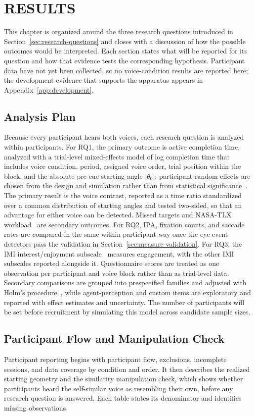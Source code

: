 \chapter{RESULTS}
\label{ch:evaluation}
This chapter is organized around the three research questions introduced in Section~\ref{sec:research-questions} and closes with a discussion of how the possible outcomes would be interpreted. Each section states what will be reported for its question and how that evidence tests the corresponding hypothesis. Participant data have not yet been collected, so no voice-condition results are reported here; the development evidence that supports the apparatus appears in Appendix~\ref{app:development}.

\section{Analysis Plan}
\label{sec:analysis-plan}
Because every participant hears both voices, each research question is analyzed within participants. For RQ1, the primary outcome is active completion time, analyzed with a trial-level mixed-effects model of log completion time that includes voice condition, period, assigned voice order, trial position within the block, and the absolute pre-cue starting angle $|\theta_0|$; participant random effects are chosen from the design and simulation rather than from statistical significance~\cite{barr2013random}. The primary result is the voice contrast, reported as a time ratio standardized over a common distribution of starting angles and tested two-sided, so that an advantage for either voice can be detected. Missed targets and NASA-TLX workload~\cite{hart1988nasatlx} are secondary outcomes. For RQ2, IPA, fixation counts, and saccade rates are compared in the same within-participant way once the eye-event detectors pass the validation in Section~\ref{sec:measure-validation}. For RQ3, the IMI interest/enjoyment subscale~\cite{mcauley1989imi} measures engagement, with the other IMI subscales reported alongside it. Questionnaire scores are treated as one observation per participant and voice block rather than as trial-level data. Secondary comparisons are grouped into prespecified families and adjusted with Holm's procedure~\cite{holm1979simple}, while agent-perception and custom items are exploratory and reported with effect estimates and uncertainty. The number of participants will be set before recruitment by simulating this model across candidate sample sizes.

\section{Participant Flow and Manipulation Check}
Participant reporting begins with participant flow, exclusions, incomplete sessions, and data coverage by condition and order. It then describes the realized starting geometry and the similarity manipulation check, which shows whether participants heard the self-similar voice as resembling their own, before any research question is answered. Each table states its denominator and identifies missing observations.

